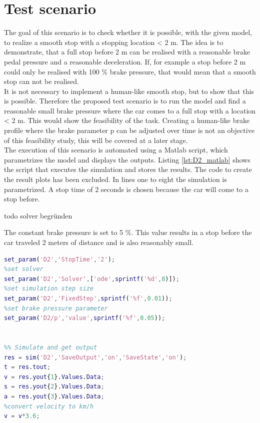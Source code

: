 \section{Test scenario}\label{sec:D2_scenario}
The goal of this scenario is to check whether it is possible, with the given model, to realize a smooth stop with a stopping location < 2 m.
The idea is to demonstrate, that a full stop before 2 m can be realised with a reasonable brake pedal pressure and a reasonable deceleration.
If, for example a stop before 2 m could only be realised with 100 \% brake pressure, that would mean that a smooth stop can not be realised.\\
It is not necessary to implement a human-like smooth stop, but to show that this is possible.
Therefore the proposed test scenario is to run the model and find a reasonable small brake pressure where the car comes to a full stop with a location < 2 m.
This would show the feasibility of the task.
Creating a human-like brake profile where the brake parameter p can be adjusted over time is not an objective of this feasibility study, this will be covered at a later stage.\\
The execution of this scenario is automated using a Matlab script, which parametrizes the model and displays the outputs.
Listing \ref{lst:D2_matlab} shows the script that executes the simulation and stores the results.
The code to create the result plots has been excluded.
In lines one to eight the simulation is parametrized.
A stop time of 2 seconds is chosen because the car will come to a stop before.

todo solver begründen

The constant brake pressure is set to 5 \%.
This value results in a stop before the car traveled 2 meters of distance and is also reasonably small.

\begin{lstlisting}[language=Matlab,basicstyle=\scriptsize, caption= Execution of the feasibility test,label= lst:D2_matlab]
%% Parametrize Model
set_param('D2','StopTime','2');
%set solver
set_param('D2','Solver',['ode',sprintf('%d',8)]);
%set simulation step size
set_param('D2','FixedStep',sprintf('%f',0.01));
%set brake pressure parameter
set_param('D2/p','value',sprintf('%f',0.05));


%% Simulate and get output
res = sim('D2','SaveOutput','on','SaveState','on');
t = res.tout;
v = res.yout{1}.Values.Data;
s = res.yout{2}.Values.Data;
a = res.yout{3}.Values.Data;
%convert velocity to km/h
v = v*3.6;
\end{lstlisting}
